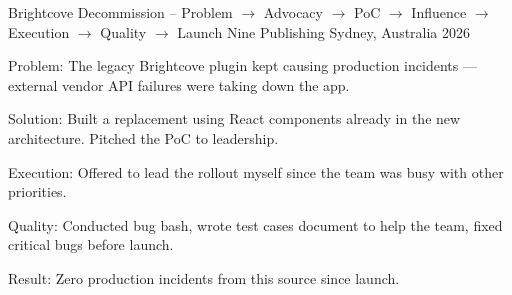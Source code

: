   \cventry
    {Brightcove Decommission -- Problem $\rightarrow$ Advocacy $\rightarrow$ PoC $\rightarrow$ Influence $\rightarrow$ Execution $\rightarrow$ Quality $\rightarrow$ Launch} %
    {Nine Publishing} %
    {Sydney, Australia} %
    {2026} %
    {
      \begin{cvitems}
        \item {Problem: The legacy Brightcove plugin kept causing production incidents --- external vendor API failures were taking down the app.}
        \item {Solution: Built a replacement using React components already in the new architecture. Pitched the PoC to leadership.}
        \item {Execution: Offered to lead the rollout myself since the team was busy with other priorities.}
        \item {Quality: Conducted bug bash, wrote test cases document to help the team, fixed critical bugs before launch.}
        \item {Result: Zero production incidents from this source since launch.}
      \end{cvitems}
    }

\smallskip
